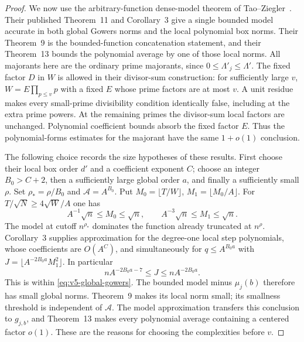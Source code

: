 \begin{proof}
We now use the arbitrary-function dense-model theorem of
Tao--Ziegler~\cite{v5tz}. Their published Theorem~11 and Corollary~3
give a single bounded model accurate in both global Gowers norms and the
local polynomial box norms. Their Theorem~9 is the bounded-function
concatenation statement, and their Theorem~13 bounds the polynomial
average by one of those local norms. All majorants here are the ordinary
prime majorants, since $0\leq\Lambda'_j\leq\Lambda'$.
The fixed factor $D$ in $W$ is allowed in their divisor-sum construction:
for sufficiently large $v$, $W=E\prod_{p\leq v}p$ with a fixed $E$ whose
prime factors are at most $v$. A unit residue makes every small-prime
divisibility condition identically false, including at the extra prime
powers. At the remaining primes the divisor-sum local factors are
unchanged. Polynomial coefficient bounds absorb the fixed factor $E$.
Thus the polynomial-forms estimates for the majorant have the same
$1+o(1)$ conclusion.

The following choice records the size hypotheses of these results.
First choose their local box order $d'$ and a coefficient exponent $C$;
choose an integer $B_0>C+2$, then a sufficiently large global order $a$,
and finally a sufficiently small $\rho$. Set $\rho_* =\rho/B_0$ and
$\mathcal A=A^{B_0}$. Put
$M_0=\lfloor T/W\rfloor$, $M_1=\lfloor M_0/A\rfloor$.
For $T/\sqrt N\geq4\sqrt W/A$ one has
\[
 A^{-1}\sqrt n\leq M_0\leq\sqrt n,
 \qquad A^{-3}\sqrt n\leq M_1\leq\sqrt n.
\]
The model at cutoff $n^{\rho_*}$ dominates the function already truncated
at $n^\rho$. Corollary~3 supplies approximation for the degree-one local
step polynomials, whose coefficients are $O(A^C)$, and simultaneously for
$q\leq A^{B_0a}$ with
$J=\lfloor A^{-2B_0a}M_1^2\rfloor$.
In particular
\[
 nA^{-2B_0a-7}\leq J\leq nA^{-2B_0a}.
\]
This is within \eqref{eq:v5-global-gowers}. The bounded model minus
$\mu_j(b)$ therefore has small global norms. Theorem~9 makes its local
norm small; its smallness threshold is independent of $\mathcal A$.
The model approximation transfers this conclusion to $g_{j,b}$, and
Theorem~13 makes every polynomial average containing a centered factor
$o(1)$. These are the reasons for choosing the complexities before $v$.


\end{proof}
